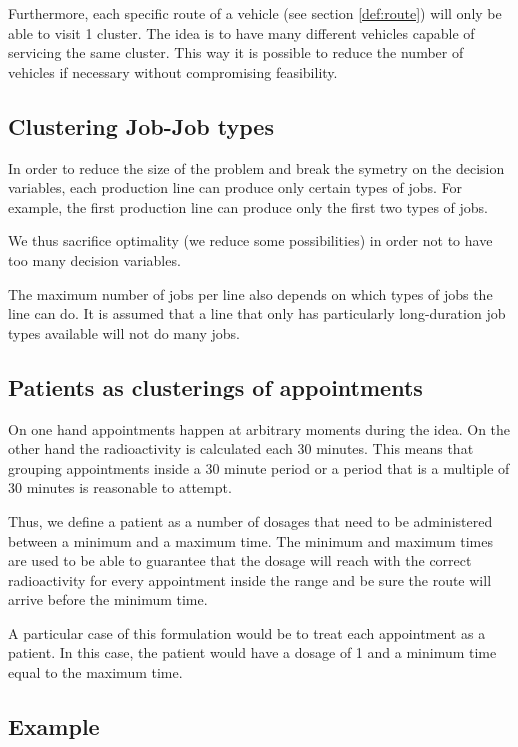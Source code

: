 Furthermore, each specific route of a vehicle (see section \ref{def:route}) will only be able to visit 1 cluster. The idea is to have many different vehicles capable of servicing the same cluster. This way it is possible to reduce the number of vehicles if necessary without compromising feasibility.

\subsection{Clustering Job-Job types}

In order to reduce the size of the problem and break the symetry on the decision variables, each production line can produce only certain types of jobs. For example, the first production line can produce only the first two types of jobs.

We thus sacrifice optimality (we reduce some possibilities) in order not to have too many decision variables.

The maximum number of jobs per line also depends on which types of jobs the line can do. It is assumed that a line that only has particularly long-duration job types available will not do many jobs.

\subsection{Patients as clusterings of appointments}
\label{sec:patients}

On one hand appointments happen at arbitrary moments during the idea. On the other hand the radioactivity is calculated each 30 minutes. This means that grouping appointments inside a 30 minute period or a period that is a multiple of 30 minutes is reasonable to attempt.

Thus, we define a patient as a number of dosages that need to be administered between a minimum and a maximum time. The minimum and maximum times are used to be able to guarantee that the dosage will reach with the correct radioactivity for every appointment inside the range and be sure the route will arrive before the minimum time.

A particular case of this formulation would be to treat each appointment as a patient. In this case, the patient would have a dosage of 1 and a minimum time equal to the maximum time.

\subsection{Example}

